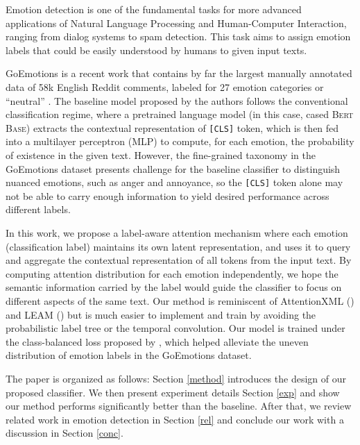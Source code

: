 Emotion detection is one of the fundamental tasks for more advanced applications of Natural Language Processing and Human-Computer Interaction, ranging from dialog systems to spam detection. This task aims to assign emotion labels that could be easily understood by humans to given input texts. 

GoEmotions is a recent work that contains by far the largest manually annotated data of 58k English Reddit comments, labeled for 27 emotion categories or ``neutral'' \citet{demszky2020goemotions}. The baseline model proposed by the authors follows the conventional classification regime, where a pretrained language model (in this case, cased \textsc{Bert Base}) extracts the contextual representation of \texttt{[CLS]} token, which is then fed into a multilayer perceptron (MLP) to compute, for each emotion, the probability of existence in the given text. However, the fine-grained taxonomy in the GoEmotions dataset presents challenge for the baseline classifier to distinguish nuanced emotions, such as anger and annoyance, so the \texttt{[CLS]} token alone may not be able to carry enough information to yield desired performance across different labels. 

In this work, we propose a label-aware attention mechanism where each emotion (classification label) maintains its own latent representation, and uses it to query and aggregate the contextual representation of all tokens from the input text. By computing attention distribution for each emotion independently, we hope the semantic information carried by the label would guide the classifier to focus on different aspects of the same text. Our method is reminiscent of AttentionXML (\citet{you2019attentionxml}) and LEAM (\citet{wang2018joint}) but is much easier to implement and train by avoiding the probabilistic label tree or the temporal convolution. Our model is trained under the class-balanced loss proposed by  \citet{cui2019classbalanced}, which helped alleviate the uneven distribution of emotion labels in the GoEmotions dataset. 


The paper is organized as follows: Section \ref{method} introduces the design of our proposed classifier. We then present experiment details Section \ref{exp} and show our method performs significantly better than the baseline. After that, we review related work in emotion detection in Section \ref{rel} and conclude our work with a discussion in Section \ref{conc}. 
